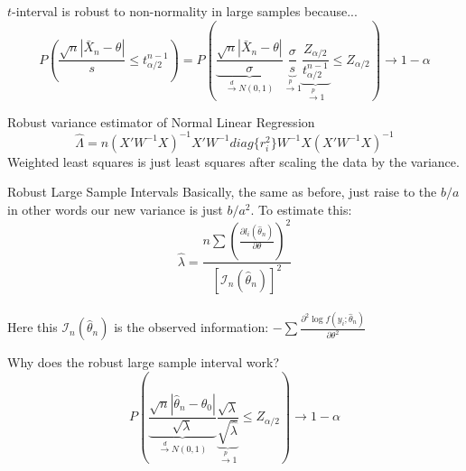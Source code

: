 \documentclass[avery5388,grid,frame]{flashcards}
\begin{document}
\begin{flashcard}[Proof]{$t$-interval is robust to non-normality in large samples because...}
\bigskip\bigskip\bigskip
\begin{equation*}
P\left(\frac{\sqrt{n}|\bar{X}_n-\theta|}{s}\leq t_{\alpha/2}^{n-1}\right)=P\left(\underbrace{\frac{\sqrt{n}|\bar{X}_n-\theta|}{\sigma}}_{\overset{d}{\rightarrow}N(0,1)}\underbrace{\frac{\sigma}{s}}_{\overset{p}{\rightarrow}1}\underbrace{\frac{Z_{\alpha/2}}{t_{\alpha/2}^{n-1}}}_{\overset{p}{\rightarrow}1}\leq Z_{\alpha/2}\right)\rightarrow1-\alpha
\end{equation*}
\end{flashcard}
\begin{flashcard}[Equation]{Robust variance estimator of Normal Linear Regression}
\bigskip\bigskip\bigskip
\begin{equation*}
\hat{\Lambda}=n(X'W^{-1}X)^{-1}X'W^{-1}diag\{r_i^2\}W^{-1}X(X'W^{-1}X)^{-1}
\end{equation*}
Weighted least squares is just least squares after scaling the data by the variance.
\end{flashcard}
\begin{flashcard}[Definition]{Robust Large Sample Intervals}
\bigskip\bigskip\bigskip
Basically, the same as before, just raise to the $b/a$ in other words our new variance is just $b/a^2$. To estimate this:
\begin{equation*}
\hat{\lambda}=\frac{n\sum\left(\frac{\partial l_i(\hat{\theta}_n)}{\partial\theta}\right)^2}{[\mathcal{I}_n(\hat{\theta}_n)]^2}
\end{equation*}
\bigskip\\ Here this $\mathcal{I}_n(\hat{\theta}_n)$ is the observed information: $-\sum\frac{\partial^2\log f(y_i;\hat{\theta}_n)}{\partial\theta^2}$
\end{flashcard}
\begin{flashcard}{Why does the robust large sample interval work?}
\bigskip\bigskip\bigskip
\begin{equation*}
P\left(\underbrace{\frac{\sqrt{n}|\hat{\theta}_n-\theta_0|}{\sqrt{\lambda}}}_{\overset{d}{\rightarrow}N(0,1)}\underbrace{\frac{\sqrt{\lambda}}{\sqrt{\hat{\lambda}}}}_{\overset{p}{\rightarrow}1}\leq Z_{\alpha/2}\right)\rightarrow 1-\alpha
\end{equation*}
\end{flashcard}
\end{document}
